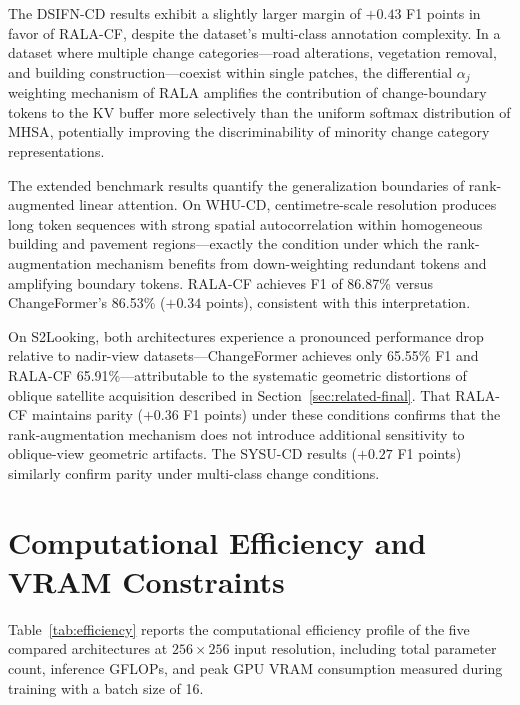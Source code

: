 The DSIFN-CD results exhibit a slightly larger margin of $+0.43$ F1 points in
favor of \ac{RALA-CF}, despite the dataset's multi-class annotation complexity.
In a dataset where multiple change categories---road alterations, vegetation
removal, and building construction---coexist within single patches, the
differential $\alpha_j$ weighting mechanism of \ac{RALA} amplifies the
contribution of change-boundary tokens to the \ac{KV} buffer more selectively
than the uniform softmax distribution of \ac{MHSA}, potentially improving the
discriminability of minority change category representations.

The extended benchmark results quantify the generalization boundaries of
rank-augmented linear attention. On WHU-CD, centimetre-scale resolution produces
long token sequences with strong spatial autocorrelation within homogeneous
building and pavement regions---exactly the condition under which the
rank-augmentation mechanism benefits from down-weighting redundant tokens and
amplifying boundary tokens. \ac{RALA-CF} achieves F1 of 86.87\% versus
ChangeFormer's 86.53\% ($+0.34$ points), consistent with this interpretation.

On S2Looking, both architectures experience a pronounced performance drop relative
to nadir-view datasets---ChangeFormer achieves only 65.55\% F1 and \ac{RALA-CF}
65.91\%---attributable to the systematic geometric distortions of oblique
satellite acquisition described in Section~\ref{sec:related-final}. That
\ac{RALA-CF} maintains parity ($+0.36$ F1 points) under these conditions confirms
that the rank-augmentation mechanism does not introduce additional sensitivity to
oblique-view geometric artifacts. The SYSU-CD results ($+0.27$ F1 points)
similarly confirm parity under multi-class change conditions.


\section{Computational Efficiency and VRAM Constraints}
\label{sec:exp-efficiency}

Table~\ref{tab:efficiency} reports the computational efficiency profile of the
five compared architectures at $256 \times 256$ input resolution, including total
parameter count, inference \ac{GFLOPs}, and peak \ac{GPU} \ac{VRAM} consumption
measured during training with a batch size of 16.

